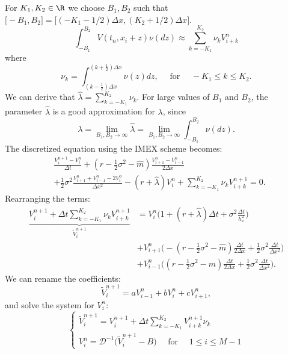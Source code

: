 For $K_1,K_2 \in \R$ we choose $B_1,B_2$ such that $ \bigl[-B_1,B_2\bigr] = \bigl[ ( -K_1-1/2 )\Delta x , ( K_2+1/2 )\Delta x \bigr] $.
\begin{equation}\label{trap_quad}
 \int_{-B_1}^{B_2}  V(t_n,x_i+z) \nu(dz) \approx \sum_{k = -K_1}^{K_2} \nu_k V^{n}_{i+k}
\end{equation}
where
\begin{equation}\label{nu1}
 \nu_k = \int_{(k-\frac{1}{2}) \Delta x}^{(k+\frac{1}{2}) \Delta x} \nu(z) dz, \hspace{1em} \mbox{ for } \hspace{1em} -K_1 \leq k \leq K_2. 
\end{equation}
We can derive that $ \hat \lambda = \sum_{k = -K_1}^{K_2} \nu_k $. For large values of $B_1$ and $B_2$, the parameter $\hat \lambda$ is a good approximation for $\lambda$, since
$$\lambda = \lim_{B_1,B_2 \to \infty} \hat \lambda = \lim_{B_1,B_2 \to \infty} \int_{-B_1}^{B_2} \nu(dz).$$
The discretized equation using the IMEX scheme becomes: 
\begin{align}
&\frac{V^{n+1}_{i} -V^{n}_{i}}{\Delta t} + 
(r-\frac{1}{2}\sigma^2 - \hat m) \frac{V^{n}_{i+1} -V^{n}_{i-1}}{ 2 \Delta x} \\ \nonumber
&+ \frac{1}{2} \sigma^2 \frac{V^{n}_{i+1} + V^{n}_{i-1} - 2 V^{n}_{i}}{\Delta x^2}  - (r+\hat \lambda) V^{n}_i +\sum_{k = -K_1}^{K_2} \nu_k V^{n+1}_{i+k} = 0.
\end{align}
Rearranging the terms: 
\begin{align*}
\underbrace{ V^{n+1}_{i} + \Delta t \sum_{k = -K_1}^{K_2} \nu_k V^{n+1}_{i+k} }_{\tilde V^{n+1}_i} &= 
	V^{n}_{i} \biggl( 1 + (r+\hat \lambda)\Delta t + \sigma^2 \frac{\Delta t}{h_x^2} \biggr)  \\
& + V^{n}_{i+1} \biggl( -(r -\frac{1}{2}\sigma^2 -\hat m )\frac{\Delta t}{2 \Delta x} +
\frac{1}{2}\sigma^2 \frac{\Delta t}{\Delta x^2}  \biggr)  \\
& + V^{n}_{i-1} \biggl( (r -\frac{1}{2}\sigma^2 - \hat m)\frac{\Delta t}{2 \Delta x} + 
\frac{1}{2}\sigma^2 \frac{\Delta t}{\Delta x^2}  \biggr).
\end{align*}
We can rename the coefficients:
$$ \tilde V^{n+1}_{i} = a V^{n}_{i-1} + b V^{n}_{i} + c V^{n}_{i+1}, $$
and solve the system for $V^{n}_{i}$:
\begin{equation*}
 \begin{cases}
  \tilde V^{n+1}_i = V^{n+1}_{i} + \Delta t \sum_{k = -K_1}^{K_2} V^{n+1}_{i+k} \nu_k \\
  V^{n}_{i} = \mathcal{D}^{-1} \biggl( \tilde V^{n+1}_{i} - B \biggr) \quad \mbox{ for } \quad 1 \leq i \leq M-1  
 \end{cases}
\end{equation*}

